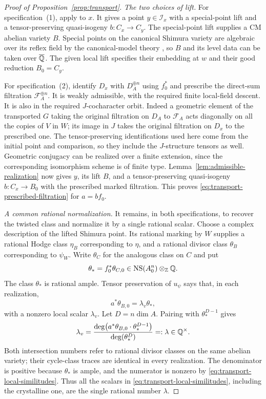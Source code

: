 \begin{proof}[Proof of Proposition~\ref{prop:transport}]
\medskip\noindent
\emph{The two choices of lift.}
For specification~(1), apply
\cite[Theorem~2.2.7]{KisinZhou2025} to $x$.  It gives a point
$y\in\mathcal I_x$ with a special-point lift and a
tensor-preserving quasi-isogeny $b:C_x\to C_y$.
The special-point lift supplies a CM abelian variety $B$.  Special
points on the canonical Shimura variety are algebraic over its
reflex field by the canonical-model theory
\cite[Definition~12.8 and Proposition~14.14]{MilneShimura}, so $B$
and its level data can be taken over $\overline{\mathbb Q}$.  The given local lift specifies their embedding at $w$
and their good reduction $B_0=C_y$.

For specification~(2), identify $D_x$ with $D_A^{\oplus n}$ using
$f_0^*$ and prescribe the direct-sum filtration
$\mathcal F_A^{\oplus n}$.  It is weakly admissible, with the
required finite local-field descent.  It is also in the required
$J$-cocharacter orbit.  Indeed a geometric element of the
transported $G$ taking the original filtration on $D_A$ to
$\mathcal F_A$ acts diagonally on all the copies of $V$ in $W$;
its image in $J$ takes the original filtration on $D_x$ to the
prescribed one.  The tensor-preserving identifications used here
come from the initial point and comparison, so they include the
$J$-structure tensors as well.  Geometric conjugacy can be
realized over a finite extension, since the corresponding
isomorphism scheme is of finite type.
Lemma~\ref{lem:admissible-realization} now gives $y$, its lift
$B$, and a tensor-preserving quasi-isogeny $b:C_x\to B_0$ with
the prescribed marked filtration.  This proves
\eqref{eq:transport-prescribed-filtration} for
$a=bf_0$.

\medskip\noindent
\emph{A common rational normalization.}
It remains, in both specifications, to recover the twisted class
and normalize it by a single rational scalar.  Choose a complex
description of the lifted Shimura point.  Its rational marking by
$W$ supplies a rational Hodge class $\eta_B$ corresponding to
$\eta$, and a rational divisor class $\theta_B$
corresponding to $\psi_W$.  Write $\theta_C$ for the analogous
class on $C$ and put
\[
 \theta_*=f_0^*\theta_{C,0}\in\operatorname{NS}(A_0^n)\otimes_\mathbb Z\mathbb Q.
\]
The class $\theta_*$ is rational ample.  Tensor preservation of
$u_\psi$ says that, in each realization,
\begin{equation}
 a^*\theta_{B,0}=\lambda_v\theta_*,
 \label{eq:transport-local-similitudes}
\end{equation}
with a nonzero local scalar $\lambda_v$.  Let $D=n\dim A$.
Pairing with $\theta_*^{D-1}$ gives
\begin{equation}
 \lambda_v=
 \frac{\deg\bigl(a^*\theta_{B,0}\cdot\theta_*^{D-1}\bigr)}
      {\deg(\theta_*^D)}=:\lambda\in\mathbb Q^\times.
 \label{eq:transport-rational-similitude}
\end{equation}
Both intersection numbers refer to rational divisor classes on
the same abelian variety; their cycle-class traces are identical
in every realization.  The denominator is positive because
$\theta_*$ is ample, and the numerator is nonzero by
\eqref{eq:transport-local-similitudes}.  Thus all the scalars in
\eqref{eq:transport-local-similitudes}, including the crystalline
one, are the single rational number $\lambda$.


\end{proof}
